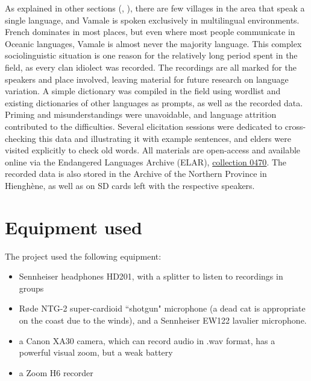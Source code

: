 As explained in other sections (, ), there are few villages in the area that speak a single language, and Vamale is spoken exclusively in multilingual environments. French dominates in most places, but even where most people communicate in Oceanic languages, Vamale is almost never the majority language. This complex sociolinguistic situation is one reason for the relatively long period spent in the field, as every clan idiolect was recorded. The recordings are all marked for the speakers and place involved, leaving material for future research on language variation. 
A simple dictionary was compiled in the field using  wordlist and existing dictionaries of other languages as prompts, as well as the recorded data. Priming and misunderstandings were unavoidable, and language attrition contributed to the difficulties. Several elicitation sessions were dedicated to cross-checking this data and illustrating it with example sentences, and elders were visited explicitly to check old words. All materials are open-access and available online via the Endangered Languages Archive (ELAR), \href{https://elar.soas.ac.uk/Record/MPI1282765}{collection 0470}. The recorded data is also stored in the Archive of the Northern Province in Hienghène, as well as on SD cards left with the respective speakers. 

\section{Equipment used}
The project used the following equipment:

\begin{itemize} 
	\item Sennheiser headphones HD201, with a splitter to listen to recordings in groups
	\item Røde NTG-2 super-cardioid ``shotgun" microphone (a dead cat is appropriate on the coast due to the winds), and a Sennheiser EW122 lavalier microphone.
	\item a Canon XA30 camera, which can record audio in .wav format, has a powerful visual zoom, but a weak battery
	\item a Zoom H6 recorder
\end{itemize}

